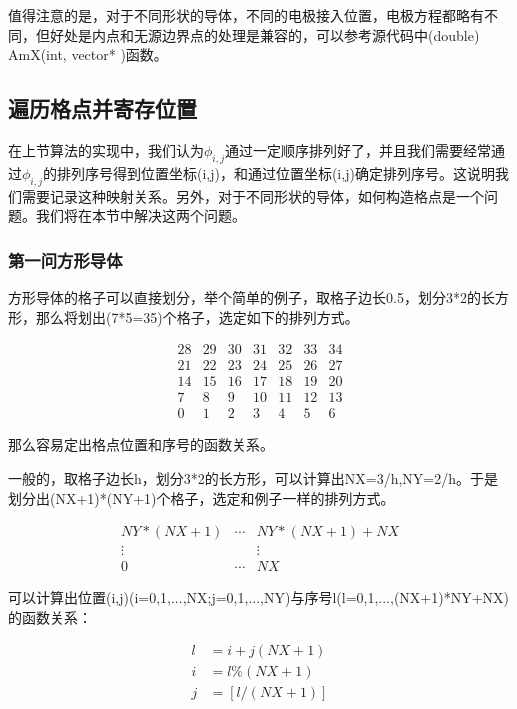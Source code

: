 \documentclass[10pt, a4paper]{article}
\begin{document}
    值得注意的是，对于不同形状的导体，不同的电极接入位置，电极方程都略有不同，但好处是内点和无源边界点的处理是兼容的，可以参考源代码中(double) AmX(int, vector* )函数。

    \subsection{遍历格点并寄存位置}

    在上节算法的实现中，我们认为$\phi_{i,j}$通过一定顺序排列好了，并且我们需要经常通过$\phi_{i,j}$的排列序号得到位置坐标(i,j)，和通过位置坐标(i,j)确定排列序号。这说明我们需要记录这种映射关系。另外，对于不同形状的导体，如何构造格点是一个问题。我们将在本节中解决这两个问题。
    
    \subsubsection{第一问方形导体}

    方形导体的格子可以直接划分，举个简单的例子，取格子边长0.5，划分3*2的长方形，那么将划出(7*5=35)个格子，选定如下的排列方式。

    \[\begin{matrix}
    28    & 29    & 30    & 31    & 32    & 33    & 34 \\
    21    & 22    & 23    & 24    & 25    & 26    & 27 \\
    14    & 15    & 16    & 17    & 18    & 19    & 20 \\
    7     & 8     & 9     & 10    & 11    & 12    & 13 \\
    0     & 1     & 2     & 3     & 4     & 5     & 6 
    \end{matrix}\]

    那么容易定出格点位置和序号的函数关系。

    一般的，取格子边长h，划分3*2的长方形，可以计算出NX=3/h,NY=2/h。于是划分出(NX+1)*(NY+1)个格子，选定和例子一样的排列方式。

    \[\begin{matrix}
    NY*(NX+1)&\cdots&NY*(NX+1)+NX\\
    \vdots& & \vdots\\
    0& \cdots& NX
    \end{matrix}\]

    可以计算出位置(i,j)(i=0,1,...,NX;j=0,1,...,NY)与序号l(l=0,1,...,(NX+1)*NY+NX)的函数关系：

    \begin{align*}
        l&=i+j(NX+1)\\
        i&=l\%(NX+1)\\
        j&=[l/(NX+1)]
    \end{align*}
\end{document}
